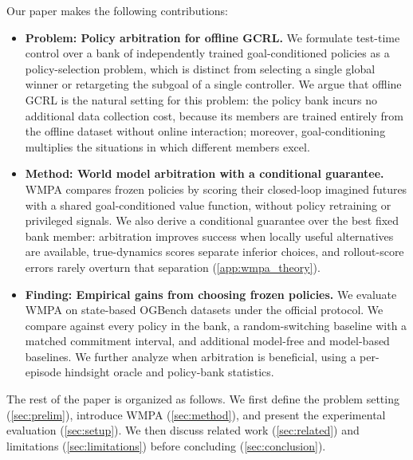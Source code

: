 \documentclass{article}
\theoremstyle{plain}
\theoremstyle{definition}
\theoremstyle{plain}
\newcommand{\wmpa}{\textsc{WMPA}}
\begin{document}
Our paper makes the following contributions:
\begin{itemize}
    \item \textbf{Problem: Policy arbitration for offline GCRL.} We formulate test-time control over a bank of independently trained goal-conditioned policies as a policy-selection problem, which is distinct from selecting a single global winner or retargeting the subgoal of a single controller. We argue that offline GCRL is the natural setting for this problem: the policy bank incurs no additional data collection cost, because its members are trained entirely from the offline dataset without online interaction; moreover, goal-conditioning multiplies the situations in which different members excel.
    \item \textbf{Method: World model arbitration with a conditional guarantee.} \wmpa{} compares frozen policies by scoring their closed-loop imagined futures with a shared goal-conditioned value function, without policy retraining or privileged signals. 
    We also derive a conditional guarantee over the best fixed bank member: arbitration improves success when locally useful alternatives are available,
    true-dynamics scores separate inferior choices, and rollout-score errors rarely overturn that separation (\cref{app:wmpa_theory}).
    \item \textbf{Finding: Empirical gains from choosing frozen policies.} We evaluate \wmpa{} on \NumEnvs{} state-based OGBench datasets under the official protocol. We compare against every policy in the bank, a random-switching baseline with a matched commitment interval, and additional model-free and model-based baselines. We further analyze when arbitration is beneficial, using a per-episode hindsight oracle and policy-bank statistics.
\end{itemize}

The rest of the paper is organized as follows. We first define the problem setting (\cref{sec:prelim}), introduce \wmpa{} (\cref{sec:method}), and present the experimental evaluation (\cref{sec:setup}). We then discuss related work (\cref{sec:related}) and limitations (\cref{sec:limitations}) before concluding (\cref{sec:conclusion}).
\end{document}

